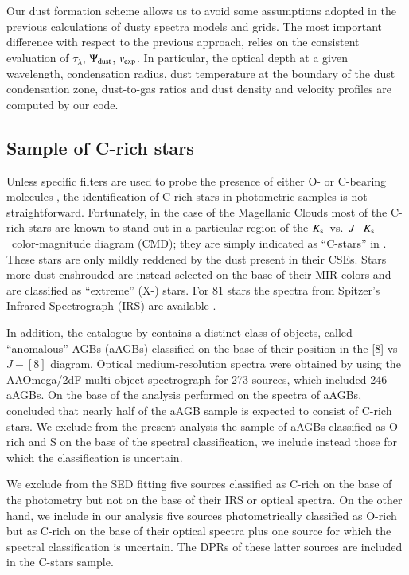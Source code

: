 \documentclass[useAMS,usenatbib]{mn2e/mn2e}
\newcommand{\jks}{\mbox{$J\!-\!K_{\rm s}$}}
\newcommand{\ks}{\mbox{$K_{\rm s}$}}
\begin{document}
Our dust formation scheme allows us to avoid some assumptions adopted in the previous calculations of dusty spectra models and grids.
The most important difference with respect to the previous approach, relies on the consistent evaluation of $\tau_\lambda$, $\Psi_{\rm dust}$, $v_{\rm exp}$. In particular, the optical depth at a given wavelength, condensation radius, dust temperature at the boundary of the dust condensation zone, dust-to-gas ratios and dust density and velocity profiles are computed by our code.   

\subsection{Sample of C-rich stars}
Unless specific filters are used to probe the presence of either O- or C-bearing molecules \citep[e.g.][]{Palmer82, Boyer13}, the identification of C-rich stars in photometric samples is not straightforward.  Fortunately, in the case of the Magellanic Clouds most of the C-rich stars are known to stand out in a particular region of the \ks~vs.~\jks\ color-magnitude diagram (CMD); they are simply indicated as ``C-stars'' in \citet{Boyer11}. These stars are only mildly reddened by the dust present in their CSEs.
Stars more dust-enshrouded are instead selected on the base of their MIR colors and are classified as ``extreme'' (X-) stars.
For 81 stars the spectra from Spitzer's Infrared Spectrograph (IRS) are available \citep{Ruffle15}.

In addition, the catalogue by \citet{Boyer11} contains a distinct class of objects, called ``anomalous'' AGBs (aAGBs) classified on the base of their position in the [8] vs $J-[8]$ diagram. 
Optical medium-resolution spectra were obtained by \citet{Boyer15} using the AAOmega/2dF multi-object spectrograph \citep{Lewis02, Saunders04, Sharp06} for 273 sources, which included 246 aAGBs.
On the base of the analysis performed on the spectra of aAGBs, \citet{Boyer15} concluded that nearly half of the aAGB sample is expected to consist of C-rich stars.
We exclude from the present analysis the sample of aAGBs classified as O-rich and S on the base of the spectral classification, we include instead those for which the classification is uncertain.

We exclude from the SED fitting five sources classified as C-rich on the base of the photometry but not on the base of their IRS or optical spectra.
On the other hand, we include in our analysis five sources photometrically classified as O-rich but as C-rich on the base of their optical spectra plus one source for which the spectral classification is uncertain. The DPRs of these latter sources are included in the C-stars sample.
\end{document}
